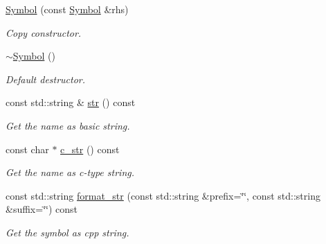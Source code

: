 \begin{DoxyCompactItemize}
\mbox{\hyperlink{classilang_1_1_symbol_a89c64866ed5cb913bed047354ad24e7f}{Symbol}} (const \mbox{\hyperlink{classilang_1_1_symbol}{Symbol}} \&rhs)
\begin{DoxyCompactList}\small\item\em Copy constructor. \end{DoxyCompactList}\item 
\mbox{\label{classilang_1_1_symbol_a27e60a194b5c2a5a9f0b02cbfc3fd627}} 
\mbox{\hyperlink{classilang_1_1_symbol_a27e60a194b5c2a5a9f0b02cbfc3fd627}{$\sim$\+Symbol}} ()
\begin{DoxyCompactList}\small\item\em Default destructor. \end{DoxyCompactList}\item 
\mbox{\label{classilang_1_1_symbol_a268f38293a5538cb1da7dc7cc36a8940}} 
const std\+::string \& \mbox{\hyperlink{classilang_1_1_symbol_a268f38293a5538cb1da7dc7cc36a8940}{str}} () const
\begin{DoxyCompactList}\small\item\em Get the name as basic string. \end{DoxyCompactList}\item 
\mbox{\label{classilang_1_1_symbol_a9c031209ed040a6dad1da0530186172d}} 
const char $\ast$ \mbox{\hyperlink{classilang_1_1_symbol_a9c031209ed040a6dad1da0530186172d}{c\+\_\+str}} () const
\begin{DoxyCompactList}\small\item\em Get the name as c-\/type string. \end{DoxyCompactList}\item 
\mbox{\label{classilang_1_1_symbol_afcddff50b929dbaeac4a5a91a582997e}} 
const std\+::string \mbox{\hyperlink{classilang_1_1_symbol_afcddff50b929dbaeac4a5a91a582997e}{format\+\_\+str}} (const std\+::string \&prefix=\char`\"{}\char`\"{}, const std\+::string \&suffix=\char`\"{}\char`\"{}) const
\begin{DoxyCompactList}\small\item\em Get the symbol as cpp string. \end{DoxyCompactList}\item 
\mbox{\label{classilang_1_1_symbol_a90d96533891063f1081d28509a4d45dd}} 

\end{DoxyCompactItemize}
